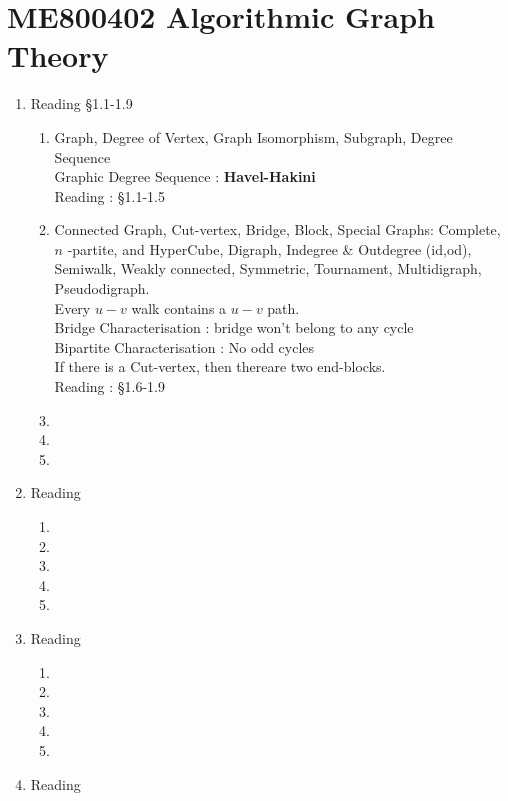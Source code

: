 \chapter{ME800402 Algorithmic Graph Theory}
\begin{enumerate}[label=Week \arabic*]
	\item Reading \S1.1-1.9
	\begin{enumerate}[label=Day \arabic*]
		\item Graph, Degree of Vertex, Graph Isomorphism, Subgraph, Degree Sequence\\
			Graphic Degree Sequence : \textbf{Havel-Hakini} \\
 			Reading : \S1.1-1.5
		\item Connected Graph, Cut-vertex, Bridge, Block, Special Graphs: Complete, $n$ -partite, and HyperCube, Digraph, Indegree \& Outdegree (id,od), Semiwalk, Weakly connected, Symmetric, Tournament, Multidigraph, Pseudodigraph.\\
			Every $u-v$ walk contains a $u-v$ path.\\
			Bridge Characterisation : bridge won't belong to any cycle\\
			Bipartite Characterisation : No odd cycles \\
			If there is a Cut-vertex, then thereare two end-blocks.\\
			Reading : \S1.6-1.9
		\item 
		\item 
		\item 
	\end{enumerate}
	\item Reading
	\begin{enumerate}[label=Day \arabic*]
		\item 
		\item 
		\item 
		\item 
		\item 
	\end{enumerate}
	\item Reading
	\begin{enumerate}[label=Day \arabic*]
		\item 
		\item 
		\item 
		\item 
		\item 
	\end{enumerate}
	\item Reading
	\begin{enumerate}[label=Day \arabic*]

\end{enumerate}
\end{enumerate}
